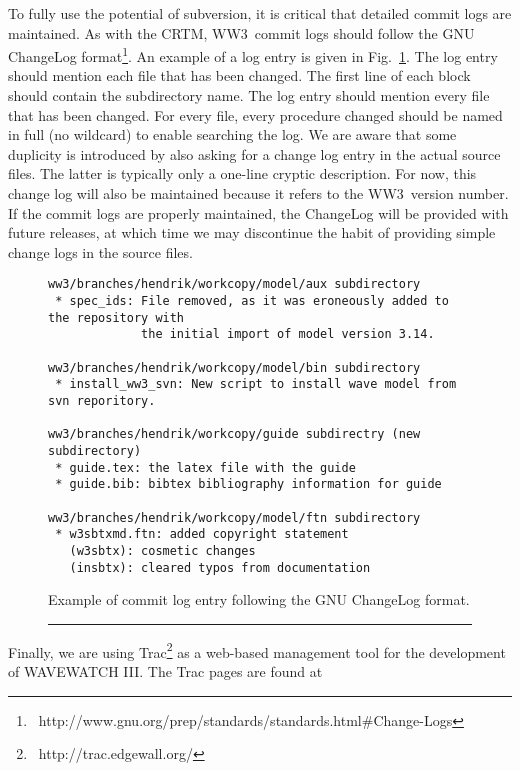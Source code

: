 \documentclass[12pt]{article}
\newcommand{\botline}{\vspace{1 mm}\rule{152mm}{0.5mm}}
\newcommand{\ww}{WAVEWATCH III}
\newcommand{\ws}{WW3}
\newcounter{myfigno}[section]
\newenvironment{myfig}[1]{\begin{figure}[#1]
                         \refstepcounter{myfigno}}                       
                        {\end{figure}}
\newcommand{\myfcap}[1]{\begin{list}{\ff Fig. \themyfigno\ :~\hfill}
                       {\rightmargin 8mm \labelsep 0mm
                        \labelwidth 8mm \leftmargin 8mm
                        \topsep 0mm \parskip 0mm \partopsep 0mm }
                        \item \ff #1 \end{list}}
\renewcommand{\themyfigno}{\thesection.\arabic{myfigno}}
\begin{document}
To fully use the potential of subversion, it is critical that detailed commit
logs are maintained. As with the CRTM, \ws\ commit logs should follow the GNU
ChangeLog format\footnote{
~http://www.gnu.org/prep/standards/standards.html\#Change-Logs}. An example of
a log entry is given in Fig.~\ref{fig:log}. The log entry should mention each
file that has been changed. The first line of each block should contain the
subdirectory name. The log entry should mention every file that has been
changed. For every file, every procedure changed should be named in full (no
wildcard) to enable searching the log. We are aware that some duplicity is
introduced by also asking for a change log entry in the actual source
files. The latter is typically only a one-line cryptic description. For now,
this change log will also be maintained because it refers to the \ws\ version
number. If the commit logs are properly maintained, the ChangeLog will be
provided with future releases, at which time we may discontinue the habit of
providing simple change logs in the source files.

\begin{myfig}{tbp}
\begin{center}
\begin{minipage}[c]{4.5in}
{\scriptsize 
\begin{verbatim}
ww3/branches/hendrik/workcopy/model/aux subdirectory
 * spec_ids: File removed, as it was eroneously added to the repository with
             the initial import of model version 3.14.

ww3/branches/hendrik/workcopy/model/bin subdirectory
 * install_ww3_svn: New script to install wave model from svn reporitory.

ww3/branches/hendrik/workcopy/guide subdirectry (new subdirectory)
 * guide.tex: the latex file with the guide
 * guide.bib: bibtex bibliography information for guide

ww3/branches/hendrik/workcopy/model/ftn subdirectory
 * w3sbtxmd.ftn: added copyright statement
   (w3sbtx): cosmetic changes
   (insbtx): cleared typos from documentation
\end{verbatim} }
\end{minipage}
\end{center}

\myfcap{Example of commit log entry following the GNU ChangeLog format.}
\label{fig:log}
\botline
\end{myfig}


\vspace{\baselineskip}
\noindent
Finally, we are using Trac\footnote{~http://trac.edgewall.org/} as a web-based
management tool for the development of \ww. The Trac pages are found at
\end{document}
